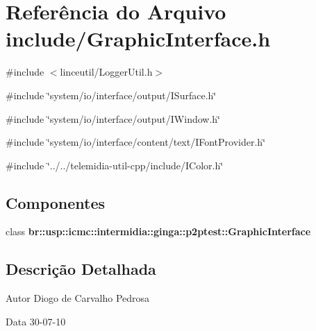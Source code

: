 \section{Referência do Arquivo include/GraphicInterface.h}
\label{GraphicInterface_8h}
{\ttfamily \#include $<$linceutil/LoggerUtil.h$>$}\par
{\ttfamily \#include \char`\"{}system/io/interface/output/ISurface.h\char`\"{}}\par
{\ttfamily \#include \char`\"{}system/io/interface/output/IWindow.h\char`\"{}}\par
{\ttfamily \#include \char`\"{}system/io/interface/content/text/IFontProvider.h\char`\"{}}\par
{\ttfamily \#include \char`\"{}../../telemidia-\/util-\/cpp/include/IColor.h\char`\"{}}\par
\subsection*{Componentes}
\begin{DoxyCompactItemize}
\item 
class {\bf br::usp::icmc::intermidia::ginga::p2ptest::GraphicInterface}
\end{DoxyCompactItemize}


\subsection{Descrição Detalhada}
\begin{DoxyAuthor}{Autor}
Diogo de Carvalho Pedrosa 
\end{DoxyAuthor}
\begin{DoxyDate}{Data}
30-\/07-\/10 
\end{DoxyDate}
